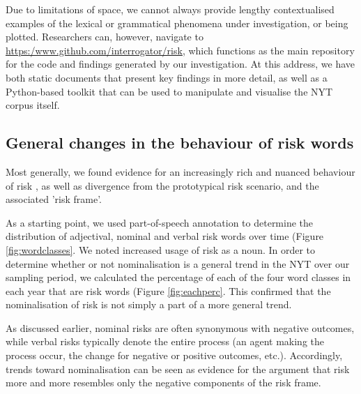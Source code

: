 Due to limitations of space, we cannot always provide lengthy contextualised examples of the lexical or grammatical phenomena under investigation, or being plotted. Researchers can, however, navigate to \url{https:/www.github.com/interrogator/risk}, which functions as the main repository for the code and findings generated by our investigation. At this address, we have both static documents that present key findings in more detail, as well as a Python-based toolkit that can be used to manipulate and visualise the NYT corpus itself.

\subsection{General changes in the behaviour of risk words}

Most generally, we found evidence for an increasingly rich and nuanced behaviour of risk , as well as divergence from the prototypical risk scenario, and the associated 'risk frame'. 

As a starting point, we used part-of-speech annotation to determine the distribution of adjectival, nominal and verbal risk words over time (Figure \ref{fig:wordclasses}. We noted increased usage of risk as a noun. In order to determine whether or not nominalisation is a general trend in the NYT over our sampling period, we calculated the percentage of each of the four word classes in each year that are risk words (Figure \ref{fig:eachperc}. This confirmed that the nominalisation of risk is not simply a part of a more general trend.





As discussed earlier, nominal risks are often synonymous with negative outcomes, while verbal risks typically denote the entire process (an agent making the process occur, the change for negative or positive outcomes, etc.). Accordingly, trends toward nominalisation can be seen as evidence for the argument that risk more and more resembles only the negative components of the risk frame. 

